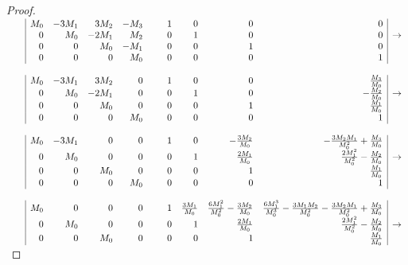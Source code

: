 \begin{proof}
\begin{math}
  \begin{array}{rr|rrrr@{\hspace{3ex}\hspace{3ex}}rrrr|c}
    && M_0 & -3M_1 &  3M_2 & -M_3  & 1 & 0 & 0 & 0 &             \\
    &&   0 &   M_0 & -2M_1 &  M_2  & 0 & 1 & 0 & 0 & \rightarrow \\ 
    &&   0 &     0 &   M_0 & -M_1  & 0 & 0 & 1 & 0 &             \\
    &&   0 &     0 &     0 &  M_0  & 0 & 0 & 0 & 1 & 
    \\ \\
    && M_0 & -3M_1 &  3M_2 &    0  & 1 & 0 & 0 &  \frac{M_3}{M_0} &             \\
    &&   0 &   M_0 & -2M_1 &    0  & 0 & 1 & 0 & -\frac{M_2}{M_0} & \rightarrow \\
    &&   0 &     0 &   M_0 &    0  & 0 & 0 & 1 &  \frac{M_1}{M_0} &             \\
    &&   0 &     0 &     0 &  M_0  & 0 & 0 & 0 &  1               &               
    \\ \\
    && M_0 & -3M_1 &     0 &    0  & 1 & 0 & -\frac{3M_2}{M_0} & -\frac{3M_2M_1}{M_0^2}+\frac{M_3}{M_0} &             \\
    &&   0 &   M_0 &     0 &    0  & 0 & 1 &  \frac{2M_1}{M_0} & \frac{2M_1^2}{M_0^2}-\frac{M_2}{M_0}   & \rightarrow \\
    &&   0 &     0 &   M_0 &    0  & 0 & 0 &  1                &  \frac{M_1}{M_0}                       &             \\
    &&   0 &     0 &     0 &  M_0  & 0 & 0 &  0                &  1                                     &               
    \\ \\
    && M_0 &     0 &     0 &    0  & 1 & \frac{3M_1}{M_0} & \frac{6M_1^2}{M_0^2}-\frac{3M_2}{M_0} & \frac{6M_1^3}{M_0^3}-\frac{3M_1M_2}{M_0^2} - \frac{3M_2M_1}{M_0^2}+\frac{M_3}{M_0} &             \\
    &&   0 &   M_0 &     0 &    0  & 0 & 1                &  \frac{2M_1}{M_0}                     & \frac{2M_1^2}{M_0^2}-\frac{M_2}{M_0}                                               & \rightarrow \\
    &&   0 &     0 &   M_0 &    0  & 0 & 0                &  1                                    & \frac{M_1}{M_0}                                                                    &             \\

\end{array}
\end{math}
\end{proof}

